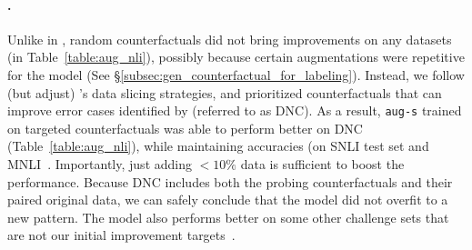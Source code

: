 \paragraph{\nli.}
Unlike in \sst, random counterfactuals did not bring improvements on any datasets (\maug in Table~\ref{table:aug_nli}), possibly because certain augmentations were repetitive for the model (See \S\ref{subsec:gen_counterfactual_for_labeling}).
Instead, we follow (but adjust) \citet{chen2019slice}'s data slicing strategies, and prioritized counterfactuals that can improve error cases identified by \citet{kim2019probing} (referred to as DNC).
As a result, \texttt{aug-s} trained on targeted counterfactuals was able to perform better on DNC (Table~\ref{table:aug_nli}), while maintaining accuracies (on SNLI test set and MNLI~\cite{williams-etal-2018-broad}.
Importantly, just adding $<10\%$ data is sufficient to boost the performance.
Because DNC includes both the probing counterfactuals and their paired original data, we can safely conclude that the model did not overfit to a new pattern.
The model also performs better on some other challenge sets that are not our initial improvement targets~\cite{naik2018stress, glockner-etal-2018-breaking, wang2018glue}.

\TableAugQQP

